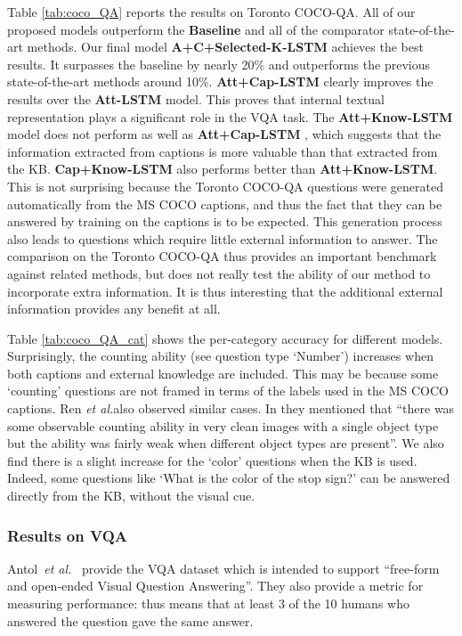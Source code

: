 \documentclass[10pt,journal,compsoc]{IEEEtran}
\newcommand{\etal}{\emph{et al.}}
\begin{document}
Table \ref{tab:coco_QA} reports the results on Toronto COCO-QA. All of our proposed models outperform the \textbf{Baseline} and all of the comparator state-of-the-art methods. Our final model \textbf{A+C+Selected-K-LSTM} achieves the best results. It surpasses the baseline by nearly 20\% and outperforms the previous state-of-the-art methods around 10\%. \textbf{Att+Cap-LSTM} clearly improves the results over the \textbf{Att-LSTM} model. This proves that internal textual representation plays a significant role in the VQA task. The \textbf{Att+Know-LSTM} model does not perform as well as \textbf{Att+Cap-LSTM} , which suggests that the information extracted from captions is more valuable than that extracted from the KB.  \textbf{Cap+Know-LSTM} also performs better than \textbf{Att+Know-LSTM}. This is not surprising because the Toronto COCO-QA questions were generated automatically from the MS COCO captions, and thus the fact that they can be answered by training on the captions is to be expected.  This generation process also leads to questions which require little external information to answer. The comparison on the Toronto COCO-QA thus provides an important benchmark against related methods, but does not really test the ability of our method to incorporate extra information.  It is thus interesting that the additional external information provides any benefit at all.

Table \ref{tab:coco_QA_cat} shows the per-category accuracy for different models. Surprisingly, the counting ability (see question type `Number') increases when both captions and external knowledge are included. This may be because some `counting' questions are not framed in terms of the labels used in the MS COCO captions. Ren \etal also observed similar cases. In \cite{ren2015image} they mentioned that ``there was some observable counting ability in very clean images with a single object type but the ability was fairly weak when different object types are present''. We also find there is a slight increase for the `color' questions when the KB is used. Indeed, some questions like `What is the color of the stop sign?' can be answered directly from the KB, without the visual cue. 

\subsubsection{Results on VQA}
Antol~\etal~\cite{antol2015vqa} provide the VQA dataset which is intended to support ``free-form and open-ended Visual Question Answering''. They also provide a metric for measuring performance:  thus  means that at least 3 of the 10 humans who answered the question gave the same answer. 
\end{document}
